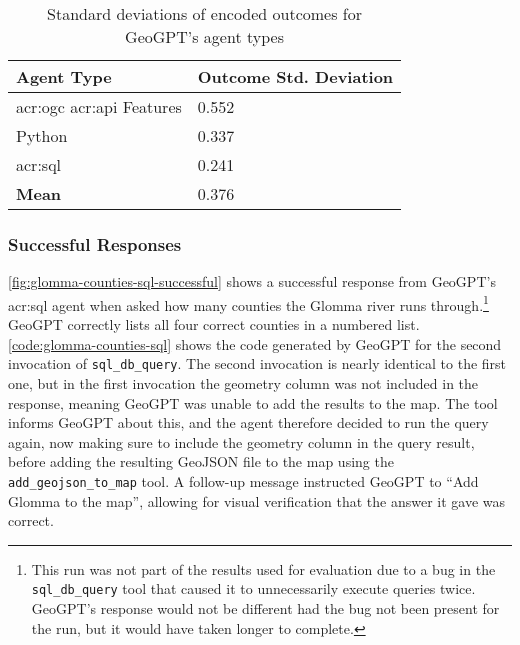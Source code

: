 \begin{table}[htbp]
    \centering
    \caption{Standard deviations of encoded outcomes for GeoGPT's agent types}
    \label{tbl:stddev-by-agent-type}
    \begin{tabularx}{0.7\textwidth}{XX}
        \toprule
        \textbf{Agent Type}                            & \textbf{Outcome Std. Deviation} \\
        \midrule
        \acrshort{acr:ogc} \acrshort{acr:api} Features & 0.552                           \\
        Python                                         & 0.337                           \\
        \acrshort{acr:sql}                             & 0.241                           \\
        \midrule
        \textbf{Mean}                                  & 0.376                           \\
        \bottomrule
    \end{tabularx}
\end{table}

\FloatBarrier

\subsubsection{Successful Responses}

\autoref{fig:glomma-counties-sql-successful} shows a successful response from GeoGPT's \acrshort{acr:sql} agent when asked how many counties the Glomma river runs through.\footnote{This run was not part of the results used for evaluation due to a bug in the \texttt{sql\_db\_query} tool that caused it to unnecessarily execute queries twice. GeoGPT's response would not be different had the bug not been present for the run, but it would have taken longer to complete.} GeoGPT correctly lists all four correct counties in a numbered list. \autoref{code:glomma-counties-sql} shows the code generated by GeoGPT for the second invocation of \texttt{sql\_db\_query}. The second invocation is nearly identical to the first one, but in the first invocation the geometry column was not included in the response, meaning GeoGPT was unable to add the results to the map. The tool informs GeoGPT about this, and the agent therefore decided to run the query again, now making sure to include the geometry column in the query result, before adding the resulting GeoJSON file to the map using the \texttt{add\_geojson\_to\_map} tool. A follow-up message instructed GeoGPT to \enquote{Add Glomma to the map}, allowing for visual verification that the answer it gave was correct.

